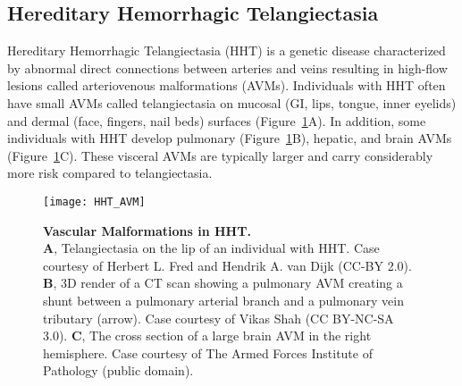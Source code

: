 \subsection{Hereditary Hemorrhagic Telangiectasia}
Hereditary Hemorrhagic Telangiectasia (HHT) is a genetic disease characterized by abnormal direct connections between arteries and veins resulting in high-flow lesions called arteriovenous malformations (AVMs). Individuals with HHT often have small AVMs called telangiectasia on mucosal (GI, lips, tongue, inner eyelids) and dermal (face, fingers, nail beds) surfaces (Figure~\ref{HHT_AVM}A). In addition, some individuals with HHT develop pulmonary (Figure~\ref{HHT_AVM}B), hepatic, and brain AVMs (Figure~\ref{HHT_AVM}C). These visceral AVMs are typically larger and carry considerably more risk compared to telangiectasia. 

\begin{figure}[bp!]
\begin{center}
\texttt{[image: HHT\_AVM]}
\end{center}
\caption[Vascular Malformations in HHT.] {\textbf{Vascular Malformations in HHT.} \\ \textbf{A}, Telangiectasia on the lip of an individual with HHT. Case courtesy of Herbert L. Fred and Hendrik A. van Dijk (CC-BY 2.0). \textbf{B}, 3D render of a CT scan showing a pulmonary AVM creating a shunt between a pulmonary arterial branch and a pulmonary vein tributary (arrow). Case courtesy of Vikas Shah (CC BY-NC-SA 3.0). \textbf{C}, The cross section of a large brain AVM in the right hemisphere. Case courtesy of The Armed Forces Institute of Pathology (public domain).}

\label{HHT_AVM}
\end{figure}

